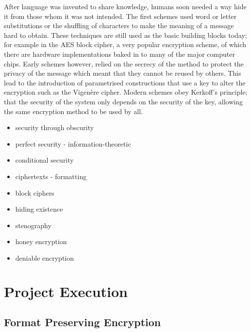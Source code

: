 \documentclass[ %
                    author={Samuel Russell},
                supervisor={Prof. Bogdan Warinschi},
                    degree={MEng},
                     title={Innocuous Ciphertexts},
                  subtitle={The DE-CENSOR Scheme},
                      type={research},
                      year={2018} ]{dissertation}
\begin{document}
After language was invented to share knowledge, humans soon needed a way hide it from those whom it was not intended. The first schemes used word or letter substitutions or the shuffling of characters to make the meaning of a message hard to obtain. These techniques are still used as the basic building blocks today; for example in the AES block cipher, a very popular encryption scheme, of which there are hardware implementations baked in to many of the major computer chips. Early schemes however, relied on the secrecy of the method to protect the privacy of the message which meant that they cannot be reused by others. This lead to the introduction of parametrised constructions that use a key to alter the encryption such as the Vigen\`ere cipher. Modern schemes obey Kerkoff's principle; that the security of the system only depends on the security of the key, allowing the same encryption method to be used by all.
\begin{itemize}
 \item security through obscurity
 \item perfect security - information-theoretic
 \item conditional security
 \item ciphertexts - formatting
 \item block ciphers
\end{itemize}

\begin{itemize}
 \item hiding existence
 \item stenography
 \item honey encryption
 \item deniable encryption
\end{itemize}


\chapter{Project Execution}
\label{chap:execution}

\section{Format Preserving Encryption}
\end{document}
